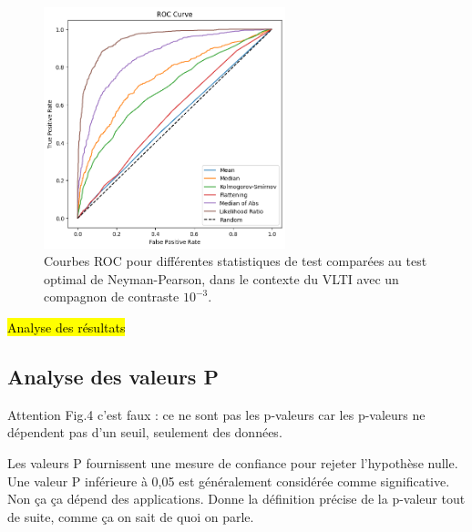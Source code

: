 \documentclass{article}
\newcommand{\dm}[1]{{\color{mulberry} #1}}
\begin{document}
\begin{figure}[H]
\centering
\includegraphics[width=7cm]{img/neyman_pearson.png}
\caption{Courbes ROC pour différentes statistiques de test comparées au test optimal de Neyman-Pearson, dans le contexte du VLTI avec un compagnon de contraste $10^{-3}$.}
\label{fig:neyman-pearson}
\end{figure}

\hl{Analyse des résultats}

\subsection{Analyse des valeurs P}

\dm{Attention Fig.4 c'est faux : ce ne sont pas les p-valeurs car les p-valeurs ne dépendent pas d'un seuil, seulement des données.}

Les valeurs P fournissent une mesure de confiance pour rejeter l'hypothèse nulle. Une valeur P inférieure à 0,05 est généralement considérée comme significative. \dm{Non ça ça dépend des applications. Donne la définition précise de la p-valeur tout de suite, comme ça on sait de quoi on parle. }\\
\end{document}
